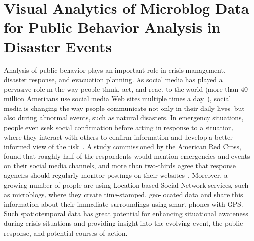 \chapter{Visual Analytics of Microblog Data for Public Behavior Analysis in Disaster Events}



Analysis of public behavior plays an important role in crisis management, disaster response, and evacuation planning. 
As social media has played a pervasive role in the way people think, act, and react to the world (more than 40 million Americans use social media Web sites multiple times a day~\cite{TW:2010:SHF}), social media is changing the way people communicate not only in their daily lives, but also during abnormal events, such as natural disasters.
In emergency situations, people even seek social confirmation before acting in response to a situation, where they interact with others to confirm information and develop a better informed view of the risk~\cite{national:2013:Public}.
A study commissioned by the American Red Cross, found that roughly half of the respondents would mention emergencies and events on their social media channels, and more than two-thirds agree that response agencies should regularly monitor postings on their websites~\cite{ARC:2010:SMD}.
Moreover, a growing number of people are using Location-based Social Network services, such as microblogs, where they create time-stamped, geo-located data and share this information about their immediate surroundings using smart phones with GPS. 
Such spatiotemporal data has great potential for enhancing situational awareness during crisis situations and providing insight into the evolving event, the public response, and potential courses of action. 

